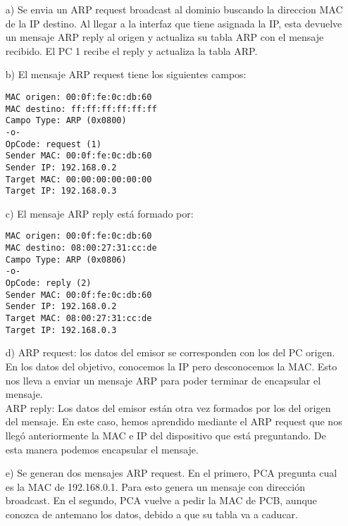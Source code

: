 \documentclass[a4paper,12pt,twoside]{article}
\begin{document}
\begin{itemize}
\item[a)] Se envia un ARP request broadcast al dominio buscando la direccion MAC de la IP destino. Al llegar a la interfaz que tiene asignada la IP, esta devuelve un mensaje ARP reply al origen y actualiza su tabla ARP con el mensaje recibido. El PC 1 recibe el reply y actualiza la tabla ARP.
\item[b)] El mensaje ARP request tiene los siguientes campos:
\begin{verbatim}
MAC origen: 00:0f:fe:0c:db:60
MAC destino: ff:ff:ff:ff:ff:ff
Campo Type: ARP (0x0800)
-o-
OpCode: request (1)
Sender MAC: 00:0f:fe:0c:db:60
Sender IP: 192.168.0.2
Target MAC: 00:00:00:00:00:00
Target IP: 192.168.0.3
\end{verbatim}
\item[c)] El mensaje ARP reply está formado por:
\begin{verbatim}
MAC origen: 00:0f:fe:0c:db:60
MAC destino: 08:00:27:31:cc:de
Campo Type: ARP (0x0806)
-o-
OpCode: reply (2)
Sender MAC: 00:0f:fe:0c:db:60
Sender IP: 192.168.0.2
Target MAC: 08:00:27:31:cc:de
Target IP: 192.168.0.3
\end{verbatim}
\item[d)] ARP request: los datos del emisor se corresponden con los del PC origen. En los datos del objetivo, conocemos la IP pero desconocemos la MAC. Esto nos lleva a enviar un mensaje ARP para poder terminar de encapsular el mensaje.\\
ARP reply: Los datos del emisor están otra vez formados por los del origen del mensaje. En este caso, hemos aprendido mediante el ARP request que nos llegó anteriormente la MAC e IP del dispositivo que está preguntando. De esta manera podemos encapsular el mensaje.
\item[e)] Se generan dos mensajes ARP request. En el primero, PCA pregunta cual es la MAC de 192.168.0.1. Para esto genera un mensaje con dirección broadcast. En el segundo, PCA vuelve a pedir la MAC de PCB, aunque conozca de antemano los datos, debido a que su tabla va a caducar.
\end{itemize} 
\end{document}
